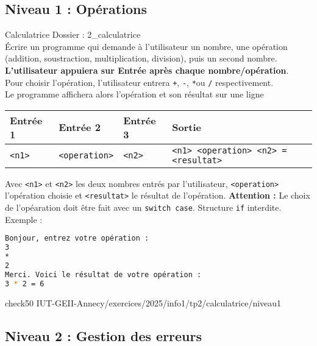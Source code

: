 \subsection{Niveau 1 : Opérations}
\begin{UPSTIManipulation}{Calculatrice}
	Dossier : 2\_calculatrice\\
	Écrire un programme qui demande à l'utilisateur un nombre, une opération (addition, soustraction, multiplication, division), puis un second nombre. \textbf{L'utilisateur appuiera sur Entrée après chaque nombre/opération}.\\
	Pour choisir l'opération, l'utilisateur entrera \texttt{+}, \texttt{-}, \texttt{*}ou \texttt{/} respectivement.\\
	Le programme affichera alors l'opération et son résultat sur une ligne

	\begin{center}
		\begin{tabular}{|l|l|l|l|}
			\hline
			Entrée 1      & Entrée 2             & Entrée 3      & Sortie                                      \\
			\hline
			\texttt{<n1>} & \texttt{<operation>} & \texttt{<n2>} & \texttt{<n1> <operation> <n2> = <resultat>} \\
			\hline
		\end{tabular}
	\end{center}
	Avec \texttt{<n1>} et \texttt{<n2>} les deux nombres entrés par l'utilisateur, \texttt{<operation>} l'opération choisie et \texttt{<resultat>} le résultat de l'opération.
	\textbf{Attention :} Le choix de l'opéaration doit être fait avec un \texttt{switch case}. Structure \texttt{if} interdite.
	Exemple :
	\begin{lstlisting}[language=bash,style=console]
Bonjour, entrez votre opération : 
3
* 
2
Merci. Voici le résultat de votre opération : 
3 * 2 = 6
\end{lstlisting}
\tcblower
	check50 IUT-GEII-Annecy/exercices/2025/info1/tp2/calculatrice/niveau1
\end{UPSTIManipulation}

\subsection{Niveau 2 : Gestion des erreurs}

